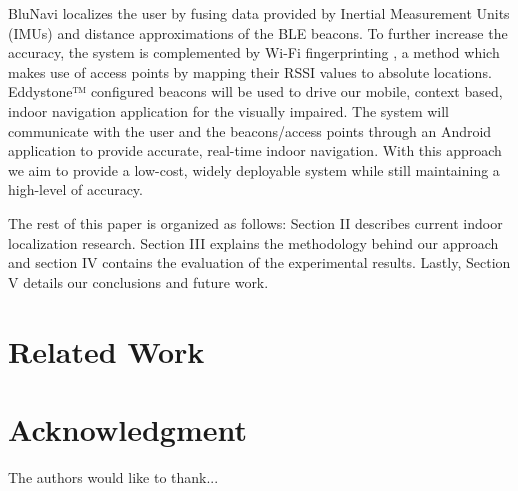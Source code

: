 \documentclass[conference]{IEEEtran}
\begin{document}
BluNavi localizes the user by fusing data provided by Inertial Measurement Units (IMUs) and distance approximations of the BLE beacons. To further increase the accuracy, the system is complemented by Wi-Fi fingerprinting , a method which makes use of access points by mapping their RSSI values to absolute locations. Eddystone™ configured beacons will be used to drive our mobile, context based, indoor navigation application for the visually impaired. The system will communicate with the user and the beacons/access points through an Android application to provide accurate, real-time indoor navigation. With this approach we aim to provide a low-cost, widely deployable system while still maintaining  a high-level of accuracy.

The rest of this paper is organized as follows: Section II describes current indoor localization research. Section III explains the methodology behind our approach and section IV contains the evaluation of the experimental results. Lastly, Section V details our conclusions and future work.

\section{Related Work}

\section*{Acknowledgment}


The authors would like to thank...






\end{document}
